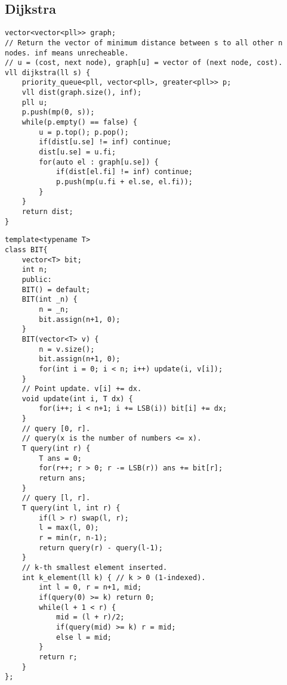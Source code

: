 \documentclass[a4paper]{article}
\begin{document}
\subsection*{Dijkstra}
\begin{verbatim}
vector<vector<pll>> graph;
// Return the vector of minimum distance between s to all other n nodes. inf means unrecheable.
// u = (cost, next node), graph[u] = vector of (next node, cost).
vll dijkstra(ll s) {
    priority_queue<pll, vector<pll>, greater<pll>> p;
    vll dist(graph.size(), inf);
    pll u;
    p.push(mp(0, s));
    while(p.empty() == false) {
        u = p.top(); p.pop();
        if(dist[u.se] != inf) continue;
        dist[u.se] = u.fi;
        for(auto el : graph[u.se]) {
            if(dist[el.fi] != inf) continue;
            p.push(mp(u.fi + el.se, el.fi));
        }
    }
    return dist;
}
\end{verbatim}
\begin{multicols}{2}
\begin{verbatim}
template<typename T>
class BIT{
    vector<T> bit;
    int n;
    public:
    BIT() = default;
    BIT(int _n) {
        n = _n;
        bit.assign(n+1, 0);
    }
    BIT(vector<T> v) {
        n = v.size();
        bit.assign(n+1, 0);
        for(int i = 0; i < n; i++) update(i, v[i]);
    }
    // Point update. v[i] += dx.
    void update(int i, T dx) {
        for(i++; i < n+1; i += LSB(i)) bit[i] += dx;
    }
    // query [0, r].
    // query(x is the number of numbers <= x).
    T query(int r) {
        T ans = 0;
        for(r++; r > 0; r -= LSB(r)) ans += bit[r];
        return ans;
    }
    // query [l, r].
    T query(int l, int r) {
        if(l > r) swap(l, r);
        l = max(l, 0);
        r = min(r, n-1);
        return query(r) - query(l-1);
    }
    // k-th smallest element inserted.
    int k_element(ll k) { // k > 0 (1-indexed).
        int l = 0, r = n+1, mid;
        if(query(0) >= k) return 0;
        while(l + 1 < r) {
            mid = (l + r)/2;
            if(query(mid) >= k) r = mid;
            else l = mid;
        }
        return r;
    }
};
\end{verbatim}
\end{multicols}
\begin{verbatim}
\end{verbatim}
\begin{verbatim}
\end{verbatim}
\end{document}
